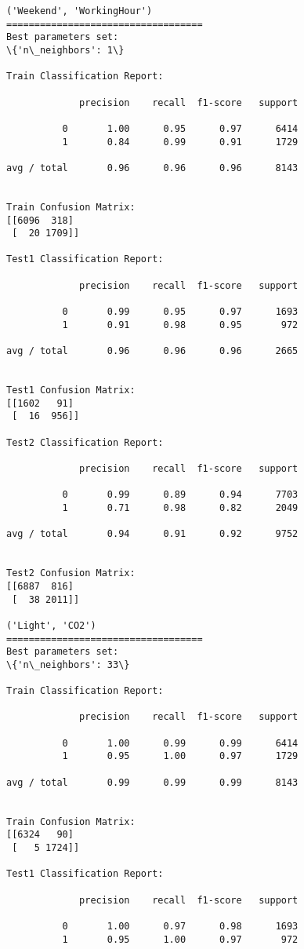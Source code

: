 \documentclass[11pt]{article}
\begin{document}
    \begin{Verbatim}[commandchars=\\\{\}]
('Weekend', 'WorkingHour')
===================================
Best parameters set:
\{'n\_neighbors': 1\}

Train Classification Report:

             precision    recall  f1-score   support

          0       1.00      0.95      0.97      6414
          1       0.84      0.99      0.91      1729

avg / total       0.96      0.96      0.96      8143


Train Confusion Matrix:
[[6096  318]
 [  20 1709]]

Test1 Classification Report:

             precision    recall  f1-score   support

          0       0.99      0.95      0.97      1693
          1       0.91      0.98      0.95       972

avg / total       0.96      0.96      0.96      2665


Test1 Confusion Matrix:
[[1602   91]
 [  16  956]]

Test2 Classification Report:

             precision    recall  f1-score   support

          0       0.99      0.89      0.94      7703
          1       0.71      0.98      0.82      2049

avg / total       0.94      0.91      0.92      9752


Test2 Confusion Matrix:
[[6887  816]
 [  38 2011]]

('Light', 'CO2')
===================================
Best parameters set:
\{'n\_neighbors': 33\}

Train Classification Report:

             precision    recall  f1-score   support

          0       1.00      0.99      0.99      6414
          1       0.95      1.00      0.97      1729

avg / total       0.99      0.99      0.99      8143


Train Confusion Matrix:
[[6324   90]
 [   5 1724]]

Test1 Classification Report:

             precision    recall  f1-score   support

          0       1.00      0.97      0.98      1693
          1       0.95      1.00      0.97       972


\end{Verbatim}
\end{document}
